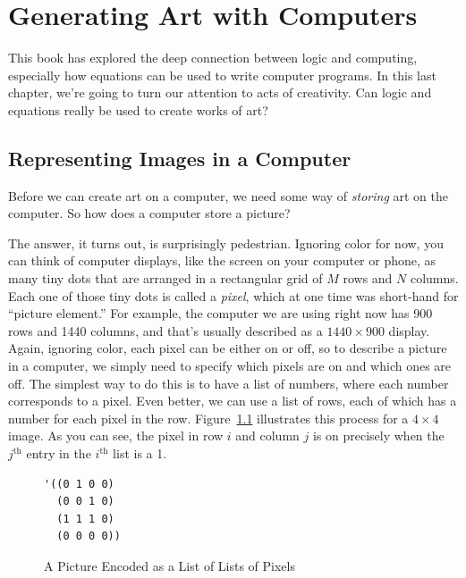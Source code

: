 \chapter{Generating Art with Computers}
\label{ch:art-computers}

This book has explored the deep connection between logic
and computing, especially how equations can be used to 
write computer programs. In this last chapter, we're going 
to turn our attention to acts of creativity. Can logic and
equations really be used to create works of art?

\section{Representing Images in a Computer}

Before we can create art on a computer, we need some way of
\emph{storing} art on the computer. So how does a computer 
store a picture?

The answer, it turns out, is surprisingly pedestrian. Ignoring
color for now, you can think of computer displays, like the
screen on your computer or phone, as many tiny dots that are
arranged in a rectangular grid of $M$ rows and $N$ columns.
Each one of those tiny dots is called a \emph{pixel}, which
at one time was short-hand for ``picture element.''
For example, the computer we are using right now has 900 rows
and 1440 columns, and that's usually described as a 
$1440\times900$ display. Again, ignoring color, each pixel can
be either on or off, so to describe a picture in a computer,
we simply need to specify which pixels are on and which ones
are off. The simplest way to do this is to have a list of
numbers, where each number corresponds to a pixel. Even better,
we can use a list of rows, each of which has a number for each
pixel in the row. Figure~\ref{fig:glider-in-images} illustrates 
this process for a $4\times4$ image. As you can see, the pixel
in row $i$ and column $j$ is on precisely when the $j^\text{th}$
entry in the $i^\text{th}$ list is a 1.

\begin{figure}
\begin{center}
\begin{minipage}{3cm}
\begin{verbatim}
'((0 1 0 0) 
  (0 0 1 0) 
  (1 1 1 0) 
  (0 0 0 0))
\end{verbatim}
\end{minipage}%
\begin{minipage}{3cm}
\end{minipage}
\end{center}
\caption{A Picture Encoded as a List of Lists of Pixels}
\label{fig:glider-in-images}
\end{figure}

